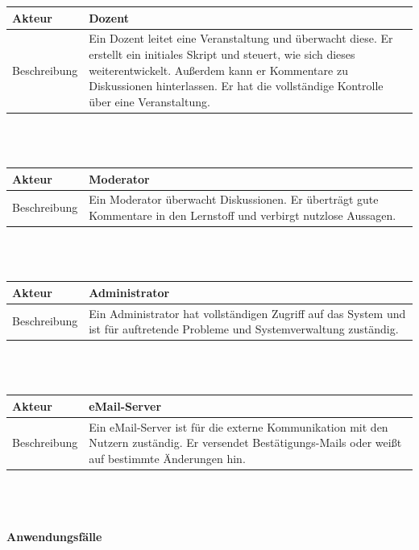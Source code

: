 \documentclass[12pt,a4paper]{article}
\begin{document}
\begin{tabular}{l p{12cm}}
	Akteur & \textbf{Dozent} \\ 
	\hline 
	Beschreibung 	& Ein Dozent leitet eine Veranstaltung und überwacht diese. Er erstellt ein initiales Skript und steuert, wie sich dieses weiterentwickelt. Außerdem kann er Kommentare zu Diskussionen hinterlassen. Er hat die vollständige Kontrolle über eine Veranstaltung.\\ 
\end{tabular}\\\\

\begin{tabular}{l p{12cm}}
	Akteur & \textbf{Moderator} \\ 
	\hline Beschreibung & Ein Moderator überwacht Diskussionen. Er überträgt gute Kommentare in den Lernstoff und verbirgt nutzlose Aussagen.\\ 
\end{tabular}\\\\

\begin{tabular}{l p{12cm}}
	Akteur & \textbf{Administrator} \\ 
	\hline Beschreibung & Ein Administrator hat vollständigen Zugriff auf das System und ist für auftretende Probleme und Systemverwaltung zuständig. \\ 
\end{tabular}\\\\

\begin{tabular}{l p{12cm}}
	Akteur & \textbf{eMail-Server} \\ 
	\hline Beschreibung & Ein eMail-Server ist für die externe Kommunikation mit den Nutzern zuständig. Er versendet Bestätigungs-Mails oder weißt auf bestimmte Änderungen hin. \\ 
\end{tabular}\\\\

\newpage

\paragraph{Anwendungsfälle}\mbox{}\\
\end{document}
